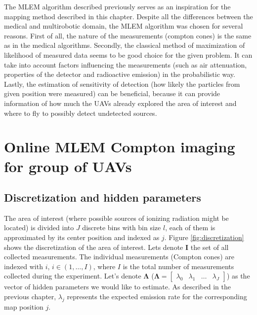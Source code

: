 {    The \ac{MLEM} algorithm described previously serves as an inspiration for the mapping method described in this chapter.
    Despite all the differences between the medical and multirobotic domain, the \ac{MLEM} algorithm was chosen for several reasons.
    First of all, the nature of the measurements (compton cones) is the same as in the medical algorithms.
    Secondly, the classical method of maximization of likelihood of measured data seems to be good choice for the given problem.
    It can take into account factors influencing the measurements (such as air attenuation, properties of the detector and radioactive emission) in the probabilistic way.
    Lastly, the estimation of sensitivity of detection (how likely the particles from given position were measured) can be beneficial, 
    because it can provide information of how much the \ac{UAV}s already explored the area of interest and where to fly to possibly detect undetected sources.
}%
\section{Online MLEM Compton imaging for group of \ac{UAV}s}
\label{sec:setup}
\subsection{Discretization and hidden parameters}

The area of interest (where possible sources of ionizing radiation might be located) is divided into $J$ discrete bins with bin size $l$, each of them is approximated by its center position and indexed as $j$.
Figure \ref{fig:discretization} shows the discretization of the area of interest.
Lets denote $\mathbf{I}$ the set of all collected measurements.
The individual measurements (Compton cones) are indexed with $i$, $i \in (1, \dots , I)$, where $I$ is the total number of measurements collected during the experiment.
Let's denote $\mathbf{\Lambda}$ ($\mathbf{\Lambda} = \begin{bmatrix}\lambda_{0} & \lambda_{1} & \dots & \lambda_{J}\end{bmatrix}$) as the vector of hidden parameters we would like to estimate.
As described in the previous chapter, $\lambda_{j}$ represents the expected emission rate for the corresponding map position $j$.

